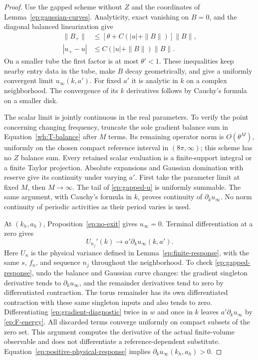 \begin{proof}
Use the gapped scheme without $Z$ and the coordinates of
Lemma~\ref{ep:gaussian-curves}.  Analyticity, exact vanishing
on $B=0$, and the diagonal balanced linearization give
\begin{align}
 \|B_+\|&\le[\theta+C(|u|+\|B\|)]\|B\|,\label{ep:gapped-B}\\
 |u_+-u|&\le C(|u|+\|B\|)\|B\|.\label{ep:gapped-u}
\end{align}
On a smaller tube the first factor is at most $\theta'<1$.
These inequalities keep nearby entry data in the tube,
make $B$ decay geometrically, and give a uniformly convergent
limit $u_\infty(k,a')$.  For fixed $a'$ it is analytic in $k$
on a complex neighborhood.  The convergence of its $k$
derivatives follows by Cauchy's formula on a smaller disk.

The scalar limit is jointly continuous in the real parameters.
To verify the point concerning changing frequency, truncate the
sole gradient balance sum in Equation~\eqref{wh:T-balance} after
$M$ terms. Its remaining operator norm is $O(\theta^M)$,
uniformly on the chosen compact reference interval in
$(8\pi,\infty)$; this scheme has no $Z$ balance sum.
Every retained scalar evaluation is a
finite-support integral or a finite Taylor projection.
Absolute expansions and Gaussian domination with reserve give
its continuity under varying $a'$.  First take the parameter
limit at fixed $M$, then $M\to\infty$.  The tail of
\eqref{ep:gapped-u} is uniformly summable.  The same argument,
with Cauchy's formula in $k$, proves continuity of
$\partial_k u_\infty$.  No norm continuity of periodic
activities as their period varies is used.

At $(k_h,a_h)$, Proposition~\ref{ep:no-exit} gives
$u_\infty=0$.  Terminal differentiation at a zero gives
\begin{equation}\label{ep:gapped-response}
 U_{n_j}'(k)\longrightarrow a'\partial_k u_\infty(k,a').
\end{equation}
Here $U_n$ is the physical variance defined in
Lemma~\ref{ep:finite-response}, with the same $s$, $f_n$, and
sequence $n_j$ throughout the neighborhood.  To check
\eqref{ep:gapped-response}, undo the balance and Gaussian
curve changes: the gradient singleton derivative tends to
$\partial_k u_\infty$, and the remainder derivatives tend
to zero by differentiated contraction.  The torus remainder
has its own differentiated contraction with these same
singleton inputs and also tends to zero.  Differentiating
\eqref{ep:gradient-diagnostic} twice in $w$ and once in $k$
leaves $a'\partial_k u_\infty$ by
\eqref{ep:F-energy}.  All discarded terms converge uniformly
on compact subsets of the zero set.  This argument computes
the derivative of the actual finite-volume observable and
does not differentiate a reference-dependent substitute.
Equation~\eqref{ep:positive-physical-response} implies
$\partial_k u_\infty(k_h,a_h)>0$.


\end{proof}
